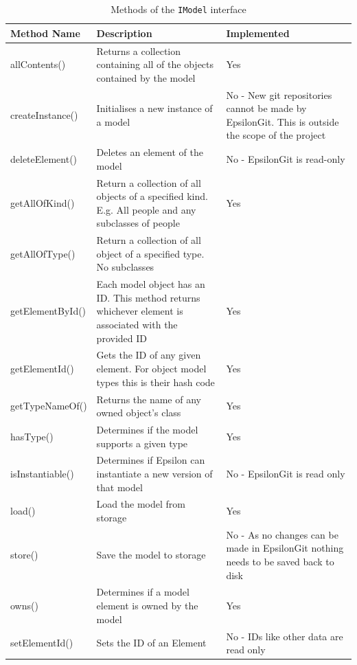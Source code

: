 \documentclass[11pt]{book}
\newcommand{\code}[1]{\texttt{#1}}
\begin{document}
\begin{table}[H]
\centering
\begin{longtable}{|p{3cm}|p{6.5cm}|p{5.5cm}|}
\hline
\textbf{Method Name} & \textbf{Description} & \textbf{Implemented} \\ \hline
allContents() & Returns a collection containing all of the objects contained by the model & Yes \\ \hline
createInstance() & Initialises a new instance of a model & No - New git repositories cannot be made by EpsilonGit. This is outside the scope of the project \\ \hline
deleteElement() & Deletes an element of the model & No - EpsilonGit is read-only \\ \hline
getAllOfKind() & Return a collection of all objects of a specified kind. E.g. All people and any subclasses of people & Yes \\ \hline
getAllOfType() & Return a collection of all object of a specified type. No subclasses &  \\ \hline
getElementById() & Each model object has an ID. This method returns whichever element is associated with the provided ID & Yes \\ \hline
getElementId() & Gets the ID of any given element. For object model types this is their hash code & Yes  \\ \hline
getTypeNameOf() & Returns the name of any owned object's class & Yes \\ \hline
hasType() & Determines if the model supports a given type & Yes \\ \hline
isInstantiable() & Determines if Epsilon can instantiate a new version of that model & No - EpsilonGit is read only \\ \hline
load() & Load the model from storage & Yes \\ \hline
store() & Save the model to storage & No - As no changes can be made in EpsilonGit nothing needs to be saved back to disk \\ \hline
owns() & Determines if a model element is owned by the model & Yes \\ \hline
setElementId() & Sets the ID of an Element & No - IDs like other data are read only \\ \hline
\end{longtable}
\caption{Methods of the \code{IModel} interface \cite{imodeljavadoc}}
\label{tab:imodel}
\end{table}
\end{document}
